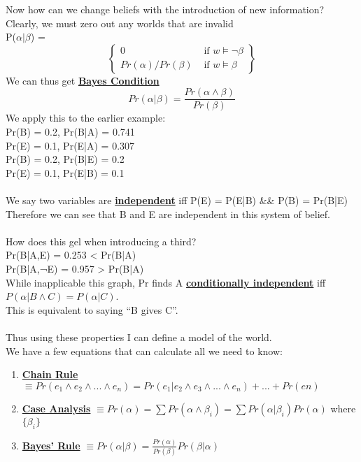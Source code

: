 \documentclass[../../lecture_notes.tex]{subfiles}
\begin{document}
\noindent Now how can we change beliefs with the introduction of new information?\\
Clearly, we must zero out any worlds that are invalid\\
P($\alpha | \beta$) = \[ \left\{ \begin{array} {lr}
				0 & \text{ if } w \models \neg\beta \\ 
				Pr(\alpha)/Pr(\beta) & \text{ if }w \models \beta  
			\end{array} \right\} \]
We can thus get \textbf{\underline{Bayes Condition}} \begin{equation*}
        Pr(\alpha | \beta) = \frac {Pr(\alpha\land\beta)} {Pr(\beta)} \end{equation*}
We apply this to the earlier example:\\
	\indent Pr(B) = 0.2, Pr(B|A) = 0.741\\
	\indent Pr(E) = 0.1, Pr(E|A) = 0.307\\
	\indent Pr(B) = 0.2, Pr(B|E) = 0.2\\
	\indent Pr(E) = 0.1, Pr(E|B) = 0.1\\
\\
We say two variables are \textbf{\underline{independent}} iff P(E) = P(E|B) \&\& P(B) = Pr(B|E)\\
Therefore we can see that B and E are independent in this system of belief.\\
\\
How does this gel when introducing a third?\\
	\indent Pr(B|A,E) = 0.253 < Pr(B|A)\\
	\indent Pr(B|A,¬E) = 0.957 > Pr(B|A)\\
While inapplicable this graph, Pr finds A \textbf{\underline{conditionally independent}} 
		iff $P(\alpha | B \land C) = P(\alpha | C)$.\\
This is equivalent to saying “B gives C”.\\
\\
Thus using these properties I can define a model of the world.\\
We have a few equations that can calculate all we need to know:
	\begin{enumerate} [itemsep=0mm]
		\item \textbf{\underline{Chain Rule}} $\equiv 
			Pr(e_1 \land e_2 \land ... \land e_n) = Pr(e_1 | e_2 \land e_3 \land ... \land e_n) + ... + Pr(en)$
		\item \textbf{\underline{Case Analysis}} $\equiv
			Pr(\alpha) = \sum Pr(\alpha\land\beta_i) = \sum Pr(\alpha | \beta_i) Pr(\alpha)$ where $\{\beta_i\}$
		\item \textbf{\underline{Bayes' Rule}} 
			$\equiv Pr(\alpha | \beta) = \frac {Pr(\alpha)}{Pr(\beta)} Pr(\beta|\alpha)$
	\end{enumerate} \medskip
\end{document}
